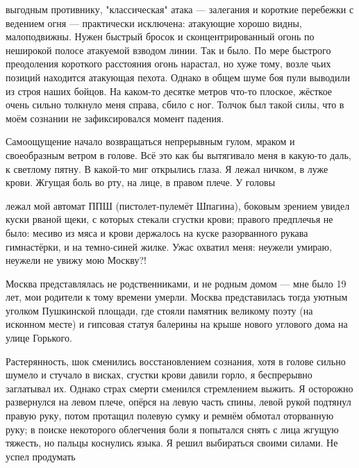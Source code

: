 \label{9-1}
выгодным противнику, "классическая" атака — залегания и короткие перебежки с ведением огня — практически исключена: атакующие хорошо видны, малоподвижны. Нужен быстрый бросок и сконцентрированный огонь по неширокой полосе атакуемой взводом линии. Так и было. По мере быстрого преодоления короткого расстояния огонь нарастал, но хуже тому, возле чьих позиций находится атакующая пехота. Однако в общем шуме боя пули выводили из строя наших бойцов. 
На каком-то десятке метров что-то плоское, жёсткое очень сильно толкнуло меня справа, сбило с ног. Толчок был такой силы, что в моём сознании не зафиксировался момент падения.

\label{9-2}
Самоощущение начало возвращаться непрерывным гулом, мраком и своеобразным ветром в голове. Всё это как бы вытягивало меня в какую-то даль, к светлому пятну. В какой-то миг открылись глаза. Я лежал ничком, в луже крови. Жгущая боль во рту, на лице, в правом плече. У головы

\label{10-1}
лежал мой автомат ППШ (пистолет-пулемёт Шпагина), боковым зрением увидел куски рваной щеки, с которых стекали сгустки крови; правого предплечья не было: месиво из мяса и крови держалось на куске разорванного рукава гимнастёрки, и на темно-синей жилке. Ужас охватил меня: неужели умираю, неужели не увижу мою Москву?!

\label{10-2}
Москва представлялась не родственниками, и не родным домом — мне было 19 лет, мои родители к тому времени умерли. Москва представилась тогда уютным уголком Пушкинской площади, где стояли памятник великому поэту (на исконном месте) и гипсовая статуя балерины на крыше нового углового дома на улице Горького.

\label{10-3}
Растерянность, шок сменились восстановлением сознания, хотя в голове сильно шумело и стучало в висках, сгустки крови давили горло, я беспрерывно заглатывал их. Однако страх смерти сменился стремлением выжить. Я осторожно развернулся на левом плече, опёрся на левую часть спины, левой рукой подтянул правую руку, потом протащил полевую сумку и ремнём обмотал оторванную руку; в поиске некоторого облегчения боли я попытался снять с лица жгущую тяжесть, но пальцы коснулись языка. Я решил выбираться своими силами. Не успел продумать

